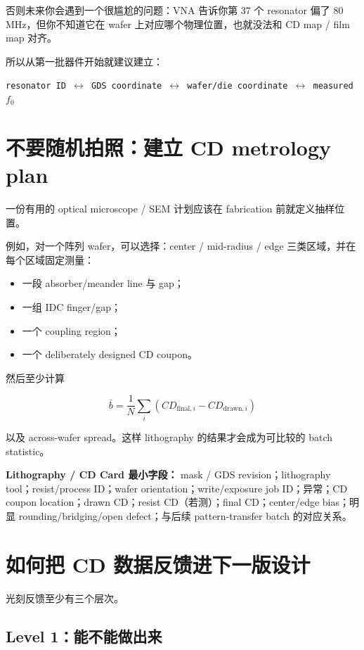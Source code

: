 否则未来你会遇到一个很尴尬的问题：VNA 告诉你第 37 个 resonator 偏了 80 MHz，但你不知道它在 wafer 上对应哪个物理位置，也就没法和 CD map / film map 对齐。

所以从第一批器件开始就建议建立：

\begin{center}
\texttt{resonator ID $\leftrightarrow$ GDS coordinate $\leftrightarrow$ wafer/die coordinate $\leftrightarrow$ measured $f_0$}
\end{center}

\section{不要随机拍照：建立 CD metrology plan}

一份有用的 optical microscope / SEM 计划应该在 fabrication 前就定义抽样位置。

例如，对一个阵列 wafer，可以选择：center / mid-radius / edge 三类区域，并在每个区域固定测量：

\begin{itemize}
  \item 一段 absorber/meander line 与 gap；
  \item 一组 IDC finger/gap；
  \item 一个 coupling region；
  \item 一个 deliberately designed CD coupon。
\end{itemize}

然后至少计算

\[
\bar b=\frac{1}{N}\sum_i(CD_{\mathrm{final},i}-CD_{\mathrm{drawn},i})
\]

以及 across-wafer spread。这样 lithography 的结果才会成为可比较的 batch statistic。

\begin{measurebox}
\textbf{Lithography / CD Card 最小字段：}
mask / GDS revision；lithography tool；resist/process ID；wafer orientation；write/exposure job ID；异常；CD coupon location；drawn CD；resist CD（若测）；final CD；center/edge bias；明显 rounding/bridging/open defect；与后续 pattern-transfer batch 的对应关系。
\end{measurebox}

\section{如何把 CD 数据反馈进下一版设计}

光刻反馈至少有三个层次。

\subsection{Level 1：能不能做出来}

